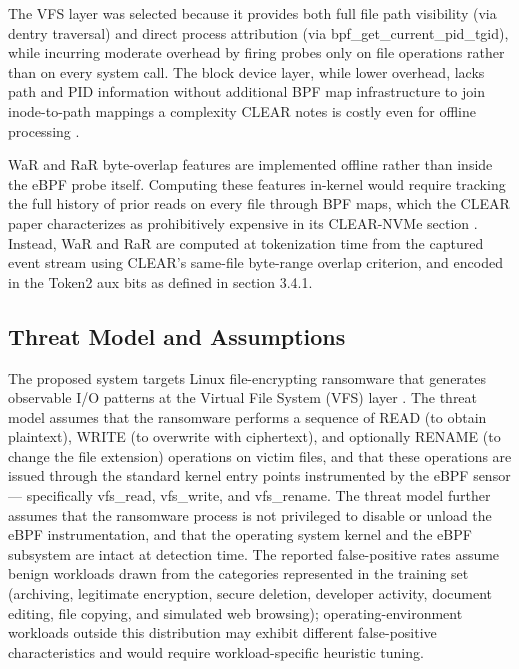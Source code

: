 The VFS layer was selected because it provides both full file path visibility (via dentry traversal) and direct process attribution (via bpf\_\allowbreak{}get\_\allowbreak{}current\_\allowbreak{}pid\_\allowbreak{}tgid), while incurring moderate overhead by firing probes only on file operations rather than on every system call. The block device layer, while lower overhead, lacks path and PID information without additional BPF map infrastructure to join inode-to-path mappings a complexity CLEAR notes is costly even for offline processing \cite{ref9}.

WaR and RaR byte-overlap features are implemented offline rather than inside the eBPF probe itself. Computing these features in-kernel would require tracking the full history of prior reads on every file through BPF maps, which the CLEAR paper characterizes as prohibitively expensive in its CLEAR-NVMe section \cite{ref9}. Instead, WaR and RaR are computed at tokenization time from the captured event stream using CLEAR's same-file byte-range overlap criterion, and encoded in the Token2 aux bits as defined in section 3.4.1.

\subsection{Threat Model and Assumptions}\label{sec:3.1.4}

The proposed system targets Linux file-encrypting ransomware that generates observable I/\allowbreak{}O patterns at the Virtual File System (VFS) layer \cite{ref50}. The threat model assumes that the ransomware performs a sequence of READ (to obtain plaintext), WRITE (to overwrite with ciphertext), and optionally RENAME (to change the file extension) operations on victim files, and that these operations are issued through the standard kernel entry points instrumented by the eBPF sensor --- specifically vfs\_\allowbreak{}read, vfs\_\allowbreak{}write, and vfs\_\allowbreak{}rename. The threat model further assumes that the ransomware process is not privileged to disable or unload the eBPF instrumentation, and that the operating system kernel and the eBPF subsystem are intact at detection time. The reported false-positive rates assume benign workloads drawn from the categories represented in the training set (archiving, legitimate encryption, secure deletion, developer activity, document editing, file copying, and simulated web browsing); operating-environment workloads outside this distribution may exhibit different false-positive characteristics and would require workload-specific heuristic tuning.

